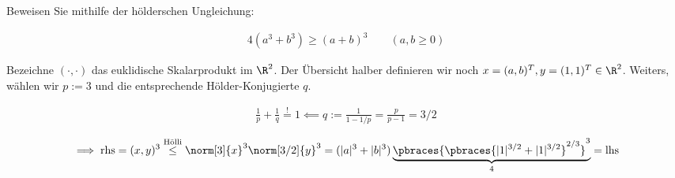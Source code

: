 
\begin{exercise}

Beweisen Sie mithilfe der hölderschen Ungleichung:

\begin{align*}
    4 (a^3 + b^3)
    \geq
    (a + b)^3
    \qquad
    (a, b \geq 0)
\end{align*}

\end{exercise}


\begin{solution}

Bezeichne $(\cdot, \cdot)$ das euklidische Skalarprodukt im $\R^2$.
Der Übersicht halber definieren wir noch $x = (a, b)^T, y = (1, 1)^T \in \R^2$.
Weiters, wählen wir $p := 3$ und die entsprechende Hölder-Konjugierte $q$.

\begin{align*}
    \frac{1}{p} + \frac{1}{q}
    \stackrel{!}{=} 1
    \impliedby
    q := \frac{1}{1 - 1/p} = \frac{p}{p-1} = 3/2
\end{align*}

\begin{align*}
    \implies
    \text{rhs}
    =
    (x, y)^3
    \stackrel{\text{Hölli}}{\leq}
    \norm[3]{x}^3 \norm[3/2]{y}^3
    =
    (|a|^3 + |b|^3)
    \underbrace
    {
        \pbraces
        {
            \pbraces
            {
                |1|^{3/2} + |1|^{3/2}
            }^{2/3}
        }^3
    }_4
    =
    \text{lhs}
\end{align*}

\end{solution}

